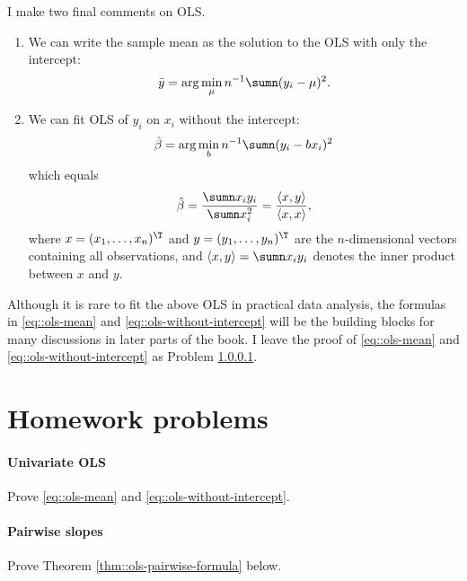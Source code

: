 I make two final comments on OLS. 
\begin{enumerate}[label=(C\arabic*), ref=C\arabic*]
\item
We can write the sample mean as the solution to the OLS with only the intercept:
\begin{equation}\label{eq::ols-mean}
\bar{y} = \arg\min_{\mu}n^{-1}\sumn(y_{i} - \mu)^{2}.
\end{equation}


\item
We can fit OLS of $y_i$ on $x_i$ without the intercept: 
\[
 \hat{\beta}=\arg\min_{b}n^{-1}\sumn(y_{i} -b x_{i})^{2} 
\]
which equals 
\begin{equation}
\label{eq::ols-without-intercept}
 \hat{\beta} 
 = \frac{ \sumn x_iy_i }{  \sumn x_i^2 } = \frac{  \langle x, y \rangle   }{ \langle x, x \rangle } , 
\end{equation}
 where $x = (x_1, \ldots, x_n)^{\T}$ and $y = (y_1, \ldots, y_n)^{\T}$ are the $n$-dimensional vectors containing all observations, and $\langle x, y \rangle = \sumn x_iy_i$ denotes the inner product between $x$ and $y$. 
 \end{enumerate}
 
 
Although it is rare to fit the above OLS in practical data analysis, the formulas in \eqref{eq::ols-mean} and \eqref{eq::ols-without-intercept} will be the building blocks for many discussions in later parts of the book. I leave the proof of \eqref{eq::ols-mean} and \eqref{eq::ols-without-intercept} as Problem \ref{hw2::univariate-ols-2}. 




\section{Homework problems}

\paragraph{Univariate OLS}\label{hw2::univariate-ols-2}

Prove   \eqref{eq::ols-mean} and \eqref{eq::ols-without-intercept}. 

\paragraph{Pairwise slopes}\label{hw2::pairwise-slope}



Prove Theorem \ref{thm::ols-pairwise-formula} below. 

